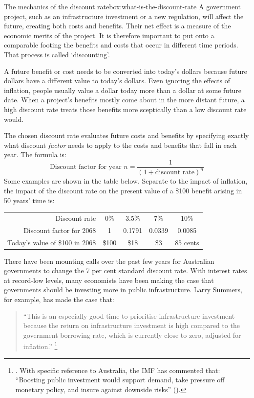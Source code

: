 \documentclass{grattan}
\begin{document}
\begin{verysmallbox}[H]{The mechanics of the discount rate}{box:what-is-the-discount-rate}
A government project, such as an infrastructure investment or a new regulation, will affect the future, creating both costs and benefits. Their net effect is a measure of the economic merits of the project. It is therefore important to put onto a comparable footing the benefits and costs that occur in different time periods. That process is called `discounting'.  

A future benefit or cost needs to be converted into today’s dollars because future dollars have a different value to today’s dollars. Even ignoring the effects of inflation, people usually value a dollar today more than a dollar at some future date. 
When a project's benefits mostly come about in the more distant future, a high discount rate treats those benefits more sceptically than a low discount rate would.

The chosen discount rate evaluates future costs and benefits by specifying exactly what discount \emph{factor} needs to apply to the costs and benefits that fall in each year. The formula is:
\[\text{Discount factor for year \(n\)} =  \frac{1}{(1+\text{discount rate})^n}\]
Some examples are shown in the table below. Separate to the impact of inflation, the impact of the discount rate on the present value of a \$100 benefit arising in 50 years' time is:
\begin{table}[H]
\centering
\begin{tabular}{rcccc}
 Discount rate & 0\% & 3.5\% & 7\% & 10\% \\
 \cmidrule{1-5}
 Discount factor for 2068 & 1 & 0.1791 & 0.0339 & 0.0085 \\
 \cmidrule{1-5}
 Today's value of \$100 in 2068 & \$100 & \$18 & \$3 & 85 cents \\ 
\end{tabular}
\end{table}
\end{verysmallbox}

There have been mounting calls over the past few years for Australian governments to change the 7 per cent standard discount rate. With interest rates at record-low levels, many economists have been making the case that governments should be investing more in public infrastructure. Larry Summers, for example, has made the case that:

\begin{quote}
\textquotedblleft This is an especially good time to prioritise infrastructure investment because the return on infrastructure investment is high compared to the government borrowing rate, which is currently close to zero, adjusted for inflation.''%
    \footnote{\textcite{Brookings-Summers-Glaeser-2017-debate-infrastructure-spending}. With specific reference to Australia, the IMF has commented that: ``Boosting public investment would support demand, take pressure off monetary policy, and insure against downside risks'' (\textcite{IMF-press-release-2015-Australian-consultation}).}
\end{quote}
 
\end{document}
